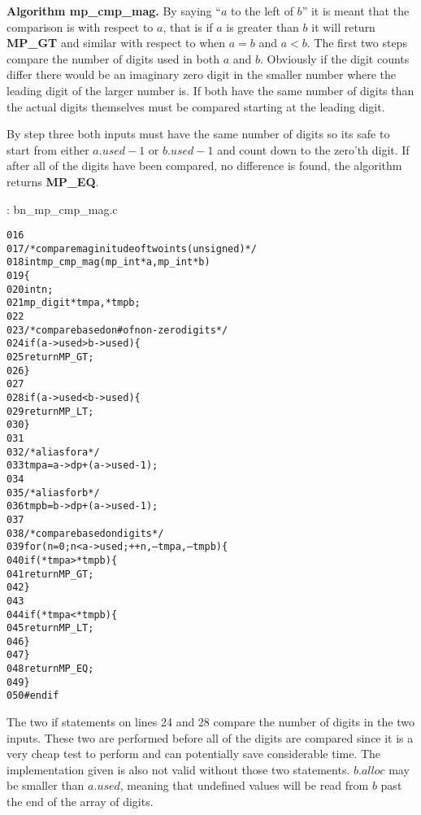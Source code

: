 \documentclass[b5paper]{book}
\begin{document}
\textbf{Algorithm mp\_cmp\_mag.}
By saying ``$a$ to the left of $b$'' it is meant that the comparison is with respect to $a$, that is if $a$ is greater than $b$ it will return
\textbf{MP\_GT} and similar with respect to when $a = b$ and $a < b$.  The first two steps compare the number of digits used in both $a$ and $b$.  
Obviously if the digit counts differ there would be an imaginary zero digit in the smaller number where the leading digit of the larger number is.  
If both have the same number of digits than the actual digits themselves must be compared starting at the leading digit.  

By step three both inputs must have the same number of digits so its safe to start from either $a.used - 1$ or $b.used - 1$ and count down to
the zero'th digit.  If after all of the digits have been compared, no difference is found, the algorithm returns \textbf{MP\_EQ}.

\vspace{+3mm}\begin{small}
\hspace{-5.1mm}{\bf File}: bn\_mp\_cmp\_mag.c
\vspace{-3mm}
\begin{alltt}
016   
017   /* compare maginitude of two ints (unsigned) */
018   int mp_cmp_mag (mp_int * a, mp_int * b)
019   \{
020     int     n;
021     mp_digit *tmpa, *tmpb;
022   
023     /* compare based on # of non-zero digits */
024     if (a->used > b->used) \{
025       return MP_GT;
026     \}
027     
028     if (a->used < b->used) \{
029       return MP_LT;
030     \}
031   
032     /* alias for a */
033     tmpa = a->dp + (a->used - 1);
034   
035     /* alias for b */
036     tmpb = b->dp + (a->used - 1);
037   
038     /* compare based on digits  */
039     for (n = 0; n < a->used; ++n, --tmpa, --tmpb) \{
040       if (*tmpa > *tmpb) \{
041         return MP_GT;
042       \}
043   
044       if (*tmpa < *tmpb) \{
045         return MP_LT;
046       \}
047     \}
048     return MP_EQ;
049   \}
050   #endif
\end{alltt}
\end{small}

The two if statements on lines 24 and 28 compare the number of digits in the two inputs.  These two are performed before all of the digits
are compared since it is a very cheap test to perform and can potentially save considerable time.  The implementation given is also not valid 
without those two statements.  $b.alloc$ may be smaller than $a.used$, meaning that undefined values will be read from $b$ past the end of the 
array of digits.
\end{document}
